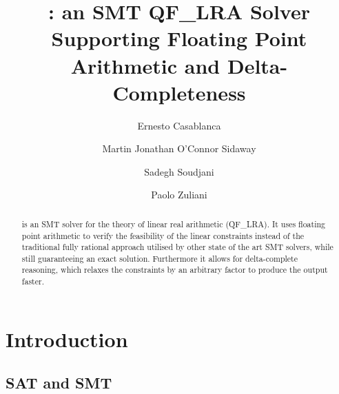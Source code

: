 \documentclass[runningheads]{llncs}
\begin{document}
\title{\dlinear: an SMT QF\_LRA Solver Supporting Floating Point Arithmetic and Delta-Completeness}
\titlerunning{\dlinear}

\author{Ernesto Casablanca
    \and
    Martin Jonathan O'Connor Sidaway
    \and
    Sadegh Soudjani
    \and
    Paolo Zuliani
}



\maketitle

\begin{abstract}
    \dlinear is an SMT solver for the theory of linear real arithmetic (QF\_LRA).
    It uses floating point arithmetic to verify the feasibility of the linear constraints instead of the traditional fully rational approach utilised by other state of the art SMT solvers,
    while still guaranteeing an exact solution.
    Furthermore it allows for delta-complete reasoning, which relaxes the constraints by an arbitrary factor to produce the output faster.

\end{abstract}

\section{Introduction}

\subsection{SAT and SMT}
\end{document}
